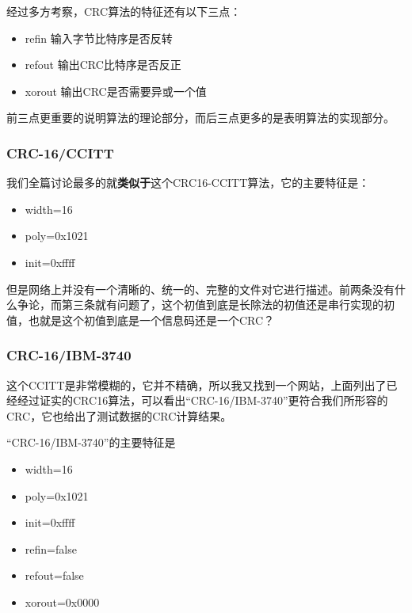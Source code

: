 \documentclass[
]{article}
\begin{document}
经过多方考察，CRC算法的特征还有以下三点：

\begin{itemize}
\item
  refin 输入字节比特序是否反转
\item
  refout 输出CRC比特序是否反正
\item
  xorout 输出CRC是否需要异或一个值
\end{itemize}

前三点更重要的说明算法的理论部分，而后三点更多的是表明算法的实现部分。

\hypertarget{header-n293}{%
\subsubsection{CRC-16/CCITT}\label{header-n293}}

我们全篇讨论最多的就\textbf{类似于}这个CRC16-CCITT算法，它的主要特征是：

\begin{itemize}
\item
  width=16
\item
  poly=0x1021
\item
  init=0xffff
\end{itemize}

但是网络上并没有一个清晰的、统一的、完整的文件对它进行描述。前两条没有什么争论，而第三条就有问题了，这个初值到底是长除法的初值还是串行实现的初值，也就是这个初值到底是一个信息码还是一个CRC？

\hypertarget{header-n303}{%
\subsubsection{CRC-16/IBM-3740}\label{header-n303}}

这个CCITT是非常模糊的，它并不精确，所以我又找到一个网站，上面列出了已经经过证实的CRC16算法，可以看出``CRC-16/IBM-3740''更符合我们所形容的CRC，它也给出了测试数据的CRC计算结果。

``CRC-16/IBM-3740''的主要特征是

\begin{itemize}
\item
  width=16
\item
  poly=0x1021
\item
  init=0xffff
\item
  refin=false
\item
  refout=false
\item
  xorout=0x0000
\end{itemize}
\end{document}
